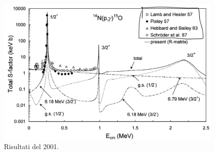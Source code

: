 \begin{figure}[!h]
	\centering
	\includegraphics[scale=0.5]{Immagini/0422_Se3.png}
	\caption{Risultati del 2001.}
	\label{0422_2001}
\end{figure}






